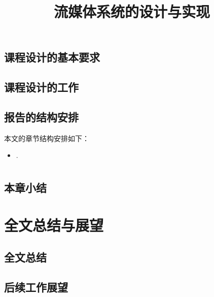 \documentclass[bachelor]{thesis-uestc}
\title{流媒体系统的设计与实现}
\author{}
\begin{document}
\begin{chineseabstract}


\chinesekeyword{}
\end{chineseabstract}

\thesistableofcontents

\thesischapterexordium

\section{课程设计的基本要求}

\section{课程设计的工作}

\section{报告的结构安排}
本文的章节结构安排如下：

\begin{itemize}
	\item .
\end{itemize}

\chapter{}
\section{}
\subsection{}
\subsubsection{}
\section{}
\section{本章小结}



\chapter{全文总结与展望}

\section{全文总结}



\section{后续工作展望}


\thesisacknowledgement





\thesisappendix
\end{document}
